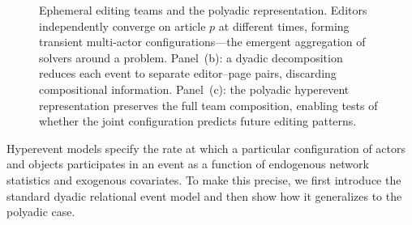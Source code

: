 \documentclass[11pt]{article}
\begin{document}
\begin{figure}[ht]
\caption{Ephemeral editing teams and the polyadic representation. Editors independently converge on article $p$ at different times, forming transient multi-actor configurations---the emergent aggregation of solvers around a problem. Panel~(b): a dyadic decomposition reduces each event to separate editor--page pairs, discarding compositional information. Panel~(c): the polyadic hyperevent representation preserves the full team composition, enabling tests of whether the joint configuration predicts future editing patterns.}
\label{fig:polyadic}
\end{figure}

Hyperevent models specify the rate at which a particular configuration of actors and objects participates in an event as a function of endogenous network statistics and exogenous covariates. To make this precise, we first introduce the standard dyadic relational event model and then show how it generalizes to the polyadic case.
\end{document}
